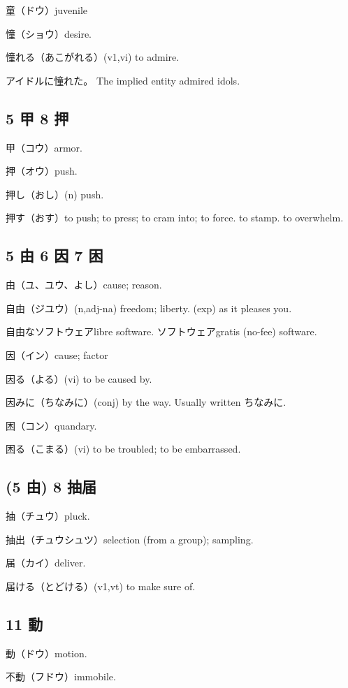 童（ドウ）juvenile

憧（ショウ）desire.

憧れる（あこがれる）(v1,vi) to admire.

アイドルに憧れた。
The implied entity admired idols.

\subsection{5 甲 8 押}

甲（コウ）armor.

押（オウ）push.

押し（おし）(n) push.

押す（おす）to push; to press; to cram into; to force.
to stamp.
to overwhelm.

\subsection{5 由 6 因 7 困}

由（ユ、ユウ、よし）cause; reason.

自由（ジユウ）(n,adj-na) freedom; liberty.
(exp) as it pleases you.

自由なソフトウェアlibre software.
ソフトウェアgratis (no-fee) software.

因（イン）cause; factor

因る（よる）(vi) to be caused by.

因みに（ちなみに）(conj) by the way.
Usually written ちなみに.

困（コン）quandary.

困る（こまる）(vi) to be troubled; to be embarrassed.

\subsection{(5 由) 8 抽届}

抽（チュウ）pluck.

抽出（チュウシュツ）selection (from a group); sampling.

届（カイ）deliver.

届ける（とどける）(v1,vt) to make sure of.

\subsection{11 動}

動（ドウ）motion.

不動（フドウ）immobile.

